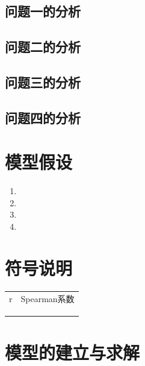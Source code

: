 \documentclass[15.75pt,a4paper]{ctexbook}
\theoremstyle{definition}
\begin{document}
	\subsection{问题一的分析}
	\subsection{问题二的分析}
	\subsection{问题三的分析}
	\subsection{问题四的分析}
	
	\section{模型假设}
	\begin{enumerate} 
		\item 
		\item 
		\item 
		\item 
	\end{enumerate}
	
	\section{符号说明}
	\begin{table}[H] %
		\captionsetup{skip=4pt} %
		\centering
		\setlength{\arrayrulewidth}{2pt} %
		\begin{tabular}{cc} %
			\hline
			\makebox[0.15\textwidth][c]{符号} & \makebox[0.6\textwidth][c]{说明}  \\ 
			\hline
			r & Spearman系数  \\
			 &   \\
			 &   \\
			 &   \\
			\hline
		\end{tabular}
	\end{table}
	
	
	\section{模型的建立与求解}
\end{document}
